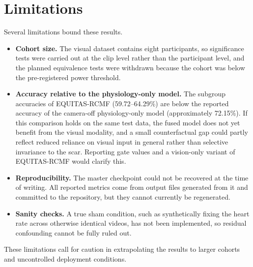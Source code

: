 \section{Limitations}
\label{sec:limitations}
Several limitations bound these results.
\begin{itemize}
    \item \textbf{Cohort size.} The visual dataset contains eight participants, so significance tests were carried out at the clip level rather than the participant level, and the planned equivalence tests were withdrawn because the cohort was below the pre-registered power threshold.
    \item \textbf{Accuracy relative to the physiology-only model.} The subgroup accuracies of EQUITAS-RCMF (59.72--64.29\%) are below the reported accuracy of the camera-off physiology-only model (approximately 72.15\%). If this comparison holds on the same test data, the fused model does not yet benefit from the visual modality, and a small counterfactual gap could partly reflect reduced reliance on visual input in general rather than selective invariance to the scar. Reporting gate values and a vision-only variant of EQUITAS-RCMF would clarify this.
    \item \textbf{Reproducibility.} The master checkpoint could not be recovered at the time of writing. All reported metrics come from output files generated from it and committed to the repository, but they cannot currently be regenerated.
    \item \textbf{Sanity checks.} A true sham condition, such as synthetically fixing the heart rate across otherwise identical videos, has not been implemented, so residual confounding cannot be fully ruled out.
\end{itemize}
These limitations call for caution in extrapolating the results to larger cohorts and uncontrolled deployment conditions.
